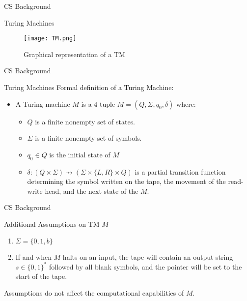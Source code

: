 \begin{frame}{CS Background}
    \begin{block}{Turing Machines}
        \begin{figure}
            \centering
            \texttt{[image: TM.png]}
            \caption{Graphical representation of a TM}
            \label{fig:my_label}
        \end{figure}
    \end{block}
\end{frame}

\begin{frame}{CS Background}
\begin{block}{Turing Machines}
Formal definition of a Turing Machine:
    \begin{itemize}
        \item A Turing machine $M$ is a 4-tuple $M = (Q,\Sigma, q_0,\delta) $ where:
        \begin{itemize}
            \item $Q$ is a finite nonempty set of states.
            \item $\Sigma$ is a finite nonempty set of symbols.
            \item $q_0\in Q$ is the initial state of $M$
            \item $\delta: (Q\times \Sigma) \nrightarrow (\Sigma \times \{L,R\}\times Q)$ is a partial transition function determining the symbol written on the tape, the movement of the read-write head, and the next state of the $M$.
        \end{itemize}
    \end{itemize}
\end{block}
\end{frame}

\begin{frame}{CS Background}
    \begin{block}{Additional Assumptions on TM $M$}
    
    \begin{enumerate}
        \item $\Sigma = \{0,1,b\}$
        \item If and when $M$ halts on an input, the tape will contain an output string $s\in \{0,1\}^*$ followed by all blank symbols, and the pointer will be set to the start of the tape.
    \end{enumerate}
    Assumptions do not affect the computational capabilities of $M$.
    \end{block}
\end{frame}
    
